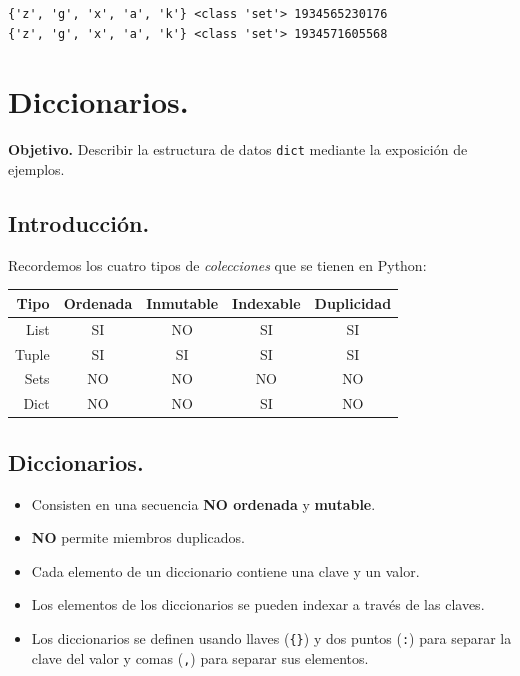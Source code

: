 \documentclass[
  spanish,
  letterpaper,
]{scrbook}
\providecommand{\tightlist}{%
  \setlength{\itemsep}{0pt}\setlength{\parskip}{0pt}}
\theoremstyle{definition}
\theoremstyle{remark}
\begin{document}
\begin{verbatim}
{'z', 'g', 'x', 'a', 'k'} <class 'set'> 1934565230176
{'z', 'g', 'x', 'a', 'k'} <class 'set'> 1934571605568
\end{verbatim}

\chapter{Diccionarios.}\label{sec-l-tuplas}

\textbf{Objetivo.} Describir la estructura de datos \texttt{dict}
mediante la exposición de ejemplos.

\section{Introducción.}\label{introducciuxf3n.-2}

Recordemos los cuatro tipos de \emph{colecciones} que se tienen en
Python:

\begin{longtable}[]{@{}rcccc@{}}
\toprule\noalign{}
Tipo & Ordenada & Inmutable & Indexable & Duplicidad \\
\midrule\noalign{}
\endhead
\bottomrule\noalign{}
\endlastfoot
List & SI & NO & SI & SI \\
Tuple & SI & SI & SI & SI \\
Sets & NO & NO & NO & NO \\
Dict & NO & NO & SI & NO \\
\end{longtable}

\section{Diccionarios.}\label{diccionarios.}

\begin{itemize}
\tightlist
\item
  Consisten en una secuencia \textbf{NO ordenada} y \textbf{mutable}.
\item
  \textbf{NO} permite miembros duplicados.
\item
  Cada elemento de un diccionario contiene una clave y un valor.
\item
  Los elementos de los diccionarios se pueden indexar a través de las
  claves.
\item
  Los diccionarios se definen usando llaves (\texttt{\{\}}) y dos puntos
  (\texttt{:}) para separar la clave del valor y comas (\texttt{,}) para
  separar sus elementos.
\end{itemize}
\end{document}
